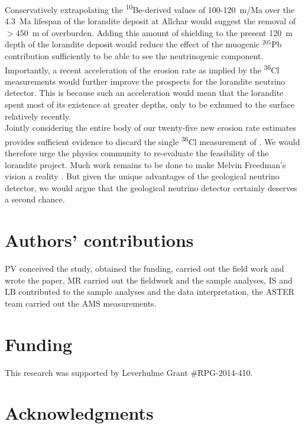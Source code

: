 \documentclass[titlepage]{article}
\begin{document}
Conservatively extrapolating the \textsuperscript{10}Be-derived values
of 100-120~m/Ma over the 4.3~Ma lifespan of the lorandite deposit at
Allchar would suggest the removal of $>450$~m of overburden.  Adding
this amount of shielding to the present 120~m depth of the lorandite
deposit would reduce the effect of the muogenic $^{205}$Pb
contribution sufficiently to be able to see the neutrinogenic
component.\\

Importantly, a recent acceleration of the erosion rate as implied by
the \textsuperscript{36}Cl measurements would further improve the
prospects for the lorandite neutrino detector.  This is because such
an acceleration would mean that the lorandite spent most of its
existence at greater depths, only to be exhumed to the surface
relatively recently.\\

Jointly considering the entire body of our twenty-five new erosion
rate estimates provides sufficient evidence to discard the single
\textsuperscript{36}Cl measurement of \citet{dockhorn1991}. We would
therefore urge the physics community to re-evaluate the feasibility of
the lorandite project. Much work remains to be done to make Melvin
Freedman's vision a reality \citep{pavicevic2012}.  But given the
unique advantages of the geological neutrino detector, we would argue
that the geological neutrino detector certainly deserves a second
chance.

\section*{Authors' contributions}

PV conceived the study, obtained the funding, carried out the field
work and wrote the paper, MR carried out the fieldwork and the sample
analyses, IS and LB contributed to the sample analyses and the data
interpretation, the ASTER team carried out the AMS measurements.

\section*{Funding}

This research was supported by Leverhulme Grant \#RPG-2014-410.

\section*{Acknowledgments}
\end{document}
